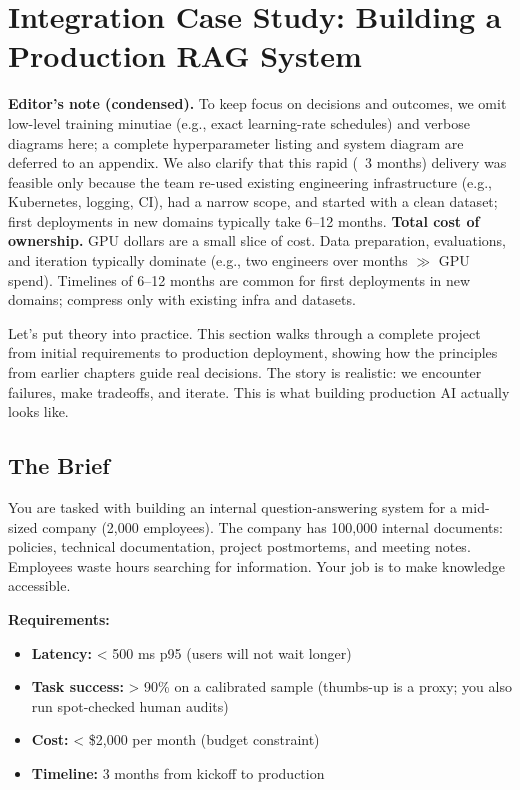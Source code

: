 \vspace{2em}

\section{Integration Case Study: Building a Production RAG System}

\vspace{0.3cm}
\textbf{Editor's note (condensed).} To keep focus on decisions and outcomes, we omit low-level training minutiae (e.g., exact learning-rate schedules) and verbose diagrams here; a complete hyperparameter listing and system diagram are deferred to an appendix. We also clarify that this rapid (~3 months) delivery was feasible only because the team re-used existing engineering infrastructure (e.g., Kubernetes, logging, CI), had a narrow scope, and started with a clean dataset; first deployments in new domains typically take 6--12 months.
\vspace{0.3cm}
\textbf{Total cost of ownership.} GPU dollars are a small slice of cost. Data preparation, evaluations, and iteration typically dominate (e.g., two engineers over months \(\gg\) GPU spend). Timelines of 6--12 months are common for first deployments in new domains; compress only with existing infra and datasets.


Let's put theory into practice. This section walks through a complete project from initial requirements to production deployment, showing how the principles from earlier chapters guide real decisions. The story is realistic: we encounter failures, make tradeoffs, and iterate. This is what building production AI actually looks like.

\vspace{1em}

\subsection{The Brief}

You are tasked with building an internal question-answering system for a mid-sized company (2,000 employees). The company has 100,000 internal documents: policies, technical documentation, project postmortems, and meeting notes. Employees waste hours searching for information. Your job is to make knowledge accessible.

\textbf{Requirements:}
\begin{itemize}
\item \textbf{Latency:} < 500 ms p95 (users will not wait longer)
\item \textbf{Task success:} > 90\% on a calibrated sample (thumbs-up is a proxy; you also run spot-checked human audits)
\item \textbf{Cost:} < \$2,000 per month (budget constraint)
\item \textbf{Timeline:} 3 months from kickoff to production
\end{itemize}


